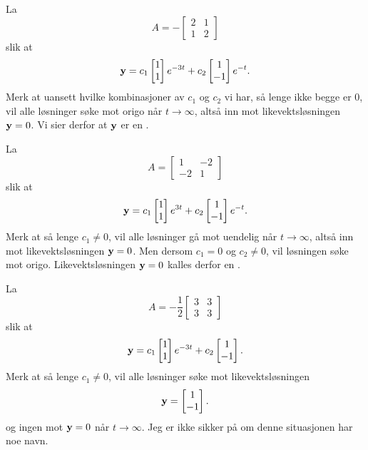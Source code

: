 \begin{ex}
La 
\[
A=
-
\begin{bmatrix}
2 & 1  \\
1 & 2 
\end{bmatrix}
\]
slik at 
\[
\mathbf{y}=
c_1
\begin{bmatrix}
1  \\
1 
\end{bmatrix} e^{-3t}
+
c_2
\begin{bmatrix}
1  \\
-1 
\end{bmatrix}e^{-t}. 
\]
Merk at uansett hvilke kombinasjoner av $c_1$ og $c_2$ vi har, så lenge ikke begge er 0, 
vil alle løsninger søke mot origo når $t\to \infty$, altså inn mot likevektsløsningen $\mathbf{y}=0$. 
Vi sier derfor at $\mathbf{y}$ er en .
\end{ex}

\begin{ex}
La 
\[
A=
\begin{bmatrix}
1 & -2   \\
-2 & 1
\end{bmatrix}
\]
slik at 
\[
\mathbf{y}=
c_1
\begin{bmatrix}
1  \\
1 
\end{bmatrix} e^{3t}
+
c_2
\begin{bmatrix}
1  \\
-1 
\end{bmatrix}e^{-t}. 
\]
Merk at så lenge $c_1 \neq 0$, 
vil alle løsninger gå mot uendelig når $t\to \infty$, altså inn mot likevektsløsningen $\mathbf{y}=0$. 
Men dersom $c_1=0$ og $c_2\neq0$, vil løsningen søke mot origo. Likevektsløsningen $\mathbf{y}=0$ kalles derfor en
.
\end{ex}


\begin{ex}
La 
\[
A=-\frac{1}{2}
\begin{bmatrix}
3 & 3   \\
3 & 3
\end{bmatrix}
\]
slik at 
\[
\mathbf{y}=
c_1
\begin{bmatrix}
1  \\
1 
\end{bmatrix} e^{-3t}
+
c_2
\begin{bmatrix}
1  \\
-1 
\end{bmatrix}. 
\]
Merk at så lenge $c_1 \neq 0$, 
vil alle løsninger søke mot likevektsløsningen
\[
\mathbf{y}=
\begin{bmatrix}
1  \\
-1 
\end{bmatrix}. 
\]
og ingen mot $\mathbf{y}=0$ når $t\to \infty$.
Jeg er ikke sikker på om denne situasjonen har noe navn. 
\end{ex}



